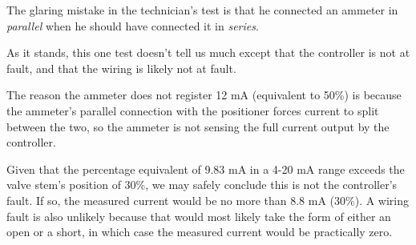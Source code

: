 





The glaring mistake in the technician's test is that he connected an ammeter in {\it parallel} when he should have connected it in {\it series}.  







As it stands, this one test doesn't tell us much except that the controller is not at fault, and that the wiring is likely not at fault.

\vskip 10pt

The reason the ammeter does not register 12 mA (equivalent to 50\%) is because the ammeter's parallel connection with the positioner forces current to split between the two, so the ammeter is not sensing the full current output by the controller.

\vskip 10pt

Given that the percentage equivalent of 9.83 mA in a 4-20 mA range exceeds the valve stem's position of 30\%, we may safely conclude this is not the controller's fault.  If so, the measured current would be no more than 8.8 mA (30\%).  A wiring fault is also unlikely because that would most likely take the form of either an open or a short, in which case the measured current would be practically zero.




